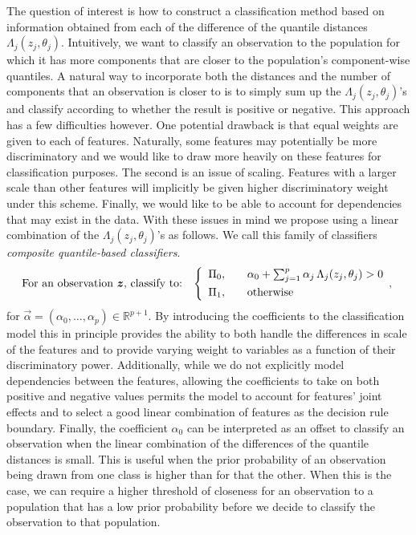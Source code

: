 The question of interest is how to construct a classification method based on
information obtained from each of the difference of the quantile distances
$\Lambda_j(z_j, \theta_j)$.  Intuitively, we want to classify an observation to
the population for which it has more components that are closer to the
population's component-wise quantiles.  A natural way to incorporate both the
distances and the number of components that an observation is closer to is to
simply sum up the $\Lambda_j(z_j, \theta_j)$'s and classify according to whether
the result is positive or negative.  This approach has a few difficulties
however.  One potential drawback is that equal weights are given to each of
features.  Naturally, some features may potentially be more discriminatory and
we would like to draw more heavily on these features for classification
purposes.  The second is an issue of scaling.  Features with a larger scale than
other features will implicitly be given higher discriminatory weight under this
scheme.  Finally, we would like to be able to account for dependencies that may
exist in the data.  With these issues in mind we propose using a linear
combination of the $\Lambda_j(z_j, \theta_j)$'s as follows.  We call this family
of classifiers \emph{composite quantile-based classifiers}.
\begin{equation}
  \label{eq:composite-classifier}
  \text{For an observation $\vec{z}$, classify to:} \hspace{3mm}
  \left\{
    \begin{array}{lll}
      \Pi_0, & & \alpha_0 + \sum_{j=1}^p \alpha_j \,
                 \Lambda_j (z_j, \theta_j) > 0 \\[1ex]
      \Pi_1, & & \text{otherwise}
    \end{array} ,
  \right.
\end{equation}
for $\vec{\alpha} = (\alpha_0, \dots, \alpha_p) \in \mathbb{R}^{p+1}$.  By
introducing the coefficients to the classification model this in principle
provides the ability to both handle the differences in scale of the features and
to provide varying weight to variables as a function of their discriminatory
power. Additionally, while we do not explicitly model dependencies between the
features, allowing the coefficients to take on both positive and negative values
permits the model to account for features' joint effects and to select a good
linear combination of features as the decision rule boundary.  Finally, the
coefficient $\alpha_0$ can be interpreted as an offset to classify an
observation when the linear combination of the differences of the quantile
distances is small.  This is useful when the prior probability of an observation
being drawn from one class is higher than for that the other.  When this is the
case, we can require a higher threshold of closeness for an observation to a
population that has a low prior probability before we decide to classify the
observation to that population.


